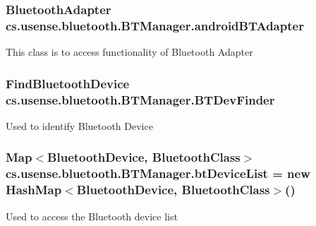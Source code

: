 \subsubsection[{android\+B\+T\+Adapter}]{\setlength{\rightskip}{0pt plus 5cm}Bluetooth\+Adapter cs.\+usense.\+bluetooth.\+B\+T\+Manager.\+android\+B\+T\+Adapter\hspace{0.3cm}{\ttfamily [private]}}\label{classcs_1_1usense_1_1bluetooth_1_1_b_t_manager_ab723a5668db796334a5568239a12dd7c}
This class is to access functionality of Bluetooth Adapter \hypertarget{classcs_1_1usense_1_1bluetooth_1_1_b_t_manager_ac1045a31137eac95b1e8538258e3d56b}{}
\subsubsection[{B\+T\+Dev\+Finder}]{\setlength{\rightskip}{0pt plus 5cm}Find\+Bluetooth\+Device cs.\+usense.\+bluetooth.\+B\+T\+Manager.\+B\+T\+Dev\+Finder\hspace{0.3cm}{\ttfamily [private]}}\label{classcs_1_1usense_1_1bluetooth_1_1_b_t_manager_ac1045a31137eac95b1e8538258e3d56b}
Used to identify Bluetooth Device \hypertarget{classcs_1_1usense_1_1bluetooth_1_1_b_t_manager_ac01ae1f551a056f0cbf7feee7b353608}{}
\subsubsection[{bt\+Device\+List}]{\setlength{\rightskip}{0pt plus 5cm}Map$<$Bluetooth\+Device, Bluetooth\+Class$>$ cs.\+usense.\+bluetooth.\+B\+T\+Manager.\+bt\+Device\+List = new Hash\+Map$<$Bluetooth\+Device, Bluetooth\+Class$>$()\hspace{0.3cm}{\ttfamily [private]}}\label{classcs_1_1usense_1_1bluetooth_1_1_b_t_manager_ac01ae1f551a056f0cbf7feee7b353608}
Used to access the Bluetooth device list \hypertarget{classcs_1_1usense_1_1bluetooth_1_1_b_t_manager_a82ed52e2ad49e81104984257a21a24d4}{}
